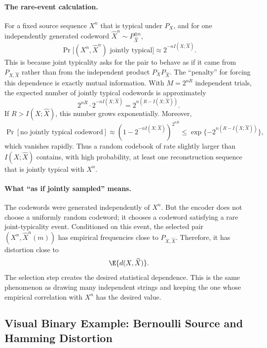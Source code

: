 \paragraph{The rare-event calculation.}
For a fixed source sequence $X^n$ that is typical under $P_X$, and for one independently generated codeword $\widehat X^n\sim P_{\widehat X}^{\otimes n}$,
\begin{equation}
    \Pr\bigl[(X^n,\widehat X^n)\text{ jointly typical}\bigr]
    \approx 2^{-nI(X;\widehat X)}.
\end{equation}
This is because joint typicality asks for the pair to behave as if it came from $P_{X,\widehat X}$ rather than from the independent product $P_XP_{\widehat X}$.
The ``penalty'' for forcing this dependence is exactly mutual information.
With $M=2^{nR}$ independent trials, the expected number of jointly typical codewords is approximately
\begin{equation}
    2^{nR}\cdot 2^{-nI(X;\widehat X)}=2^{n(R-I(X;\widehat X))}.
\end{equation}
If $R>I(X;\widehat X)$, this number grows exponentially.
Moreover,
\begin{equation}
    \Pr[\text{no jointly typical codeword}]
    \approx
    \left(1-2^{-nI(X;\widehat X)}\right)^{2^{nR}}
    \le \exp\{-2^{n(R-I(X;\widehat X))}\},
\end{equation}
which vanishes rapidly.
Thus a random codebook of rate slightly larger than $I(X;\widehat X)$ contains, with high probability, at least one reconstruction sequence that is jointly typical with $X^n$.

\paragraph{What ``as if jointly sampled'' means.}
The codewords were generated independently of $X^n$.
But the encoder does not choose a uniformly random codeword; it chooses a codeword satisfying a rare joint-typicality event.
Conditioned on this event, the selected pair $(X^n,\widehat X^n(m))$ has empirical frequencies close to $P_{X,\widehat X}$.
Therefore, it has distortion close to
\[
    \E{d(X,\widehat X)}.
\]
The selection step creates the desired statistical dependence.
This is the same phenomenon as drawing many independent strings and keeping the one whose empirical correlation with $X^n$ has the desired value.

\subsection{Visual Binary Example: Bernoulli Source and Hamming Distortion}
\label{subsec:binary-visual}

